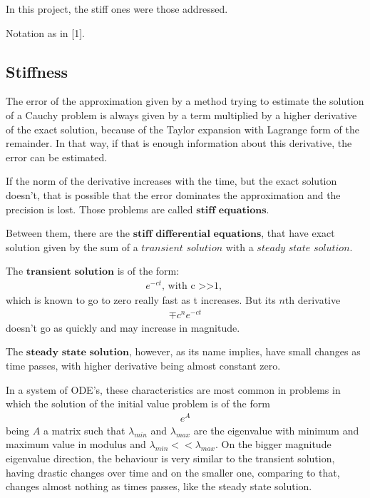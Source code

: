 \documentclass[letterpaper,10pt,english]{jupyterBook}
\begin{document}
\sphinxAtStartPar
In this project, the stiff ones were those addressed.

\sphinxAtStartPar
Notation as in {[}1{]}.


\subsection{Stiffness}
\label{\detokenize{cap1:stiffness}}
\sphinxAtStartPar
The error of the approximation given by a method trying to estimate the solution of a Cauchy problem is always given by a term multiplied by a higher derivative of the exact solution, because of the Taylor expansion with Lagrange form of the remainder. In that way, if that is enough information about this derivative, the error can be estimated.

\sphinxAtStartPar
If the norm of the derivative increases with the time, but the exact solution doesn’t, that is possible that the error dominates the approximation and the precision is lost. Those problems are called \(\textbf{stiff equations}\).

\sphinxAtStartPar
Between them, there are the \(\textbf{stiff differential equations}\), that have exact solution given by the sum of a \(\textit{transient solution}\) with a \(\textit{steady state solution}\).

\sphinxAtStartPar
The \(\textbf{transient solution}\) is of the form:
\begin{equation*}
\begin{split}
    e^{-ct} \text{, with c >>1, }
\end{split}
\end{equation*}
\sphinxAtStartPar
which is known to go to zero really fast as t increases. But its \(n\)th derivative
\begin{equation*}
\begin{split}
    \mp c^{n}e^{-ct}
\end{split}
\end{equation*}
\sphinxAtStartPar
doesn’t go as quickly and may increase in magnitude.

\sphinxAtStartPar
The \(\textbf{steady state solution}\), however, as its name implies, have small changes as time passes, with higher derivative being almost constant zero.

\sphinxAtStartPar
In a system of ODE’s, these characteristics are most common in problems in which the solution of the initial value problem is of the form
\begin{equation*}
\begin{split}
    e^{A}
\end{split}
\end{equation*}
\sphinxAtStartPar
being \(A\) a matrix such that \(\lambda_{min}\) and \(\lambda_{max}\) are the eigenvalue with minimum and maximum value in modulus and \(\lambda_{min} << \lambda_{max}\). On the bigger magnitude eigenvalue direction, the behaviour is very similar to the transient solution, having drastic changes over time and on the smaller one, comparing to that, changes almost nothing as times passes, like the steady state solution.
\end{document}
